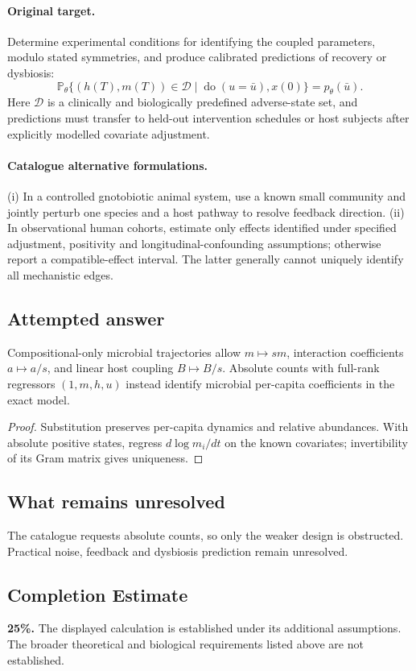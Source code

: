 \documentclass[11pt]{article}
\begin{document}
\paragraph{Original target.}
Determine experimental conditions for identifying the coupled parameters, modulo stated symmetries, and produce calibrated predictions of recovery or dysbiosis:
\[\mathbb{P}_{\theta}\{(h(T),m(T))\in\mathcal D\mid\operatorname{do}(u=\bar u),x(0)\}=p_\theta(\bar u).\]
Here $\mathcal D$ is a clinically and biologically predefined adverse-state set, and predictions must transfer to held-out intervention schedules or host subjects after explicitly modelled covariate adjustment.
\paragraph{Catalogue alternative formulations.}
(i) In a controlled gnotobiotic animal system, use a known small community and jointly perturb one species and a host pathway to resolve feedback direction. (ii) In observational human cohorts, estimate only effects identified under specified adjustment, positivity and longitudinal-confounding assumptions; otherwise report a compatible-effect interval. The latter generally cannot uniquely identify all mechanistic edges.
\subsection{Attempted answer}
\begin{proposition}
Compositional-only microbial trajectories allow $m\mapsto sm$, interaction coefficients $a\mapsto a/s$, and linear host coupling $B\mapsto B/s$. Absolute counts with full-rank regressors $(1,m,h,u)$ instead identify microbial per-capita coefficients in the exact model.
\end{proposition}
\begin{proof}
Substitution preserves per-capita dynamics and relative abundances. With absolute positive states, regress $d\log m_i/dt$ on the known covariates; invertibility of its Gram matrix gives uniqueness.
\end{proof}
\subsection{What remains unresolved}
The catalogue requests absolute counts, so only the weaker design is obstructed. Practical noise, feedback and dysbiosis prediction remain unresolved.
\subsection{Completion Estimate}
\textbf{25\%.} The displayed calculation is established under its additional assumptions. The broader theoretical and biological requirements listed above are not established.
\end{document}
